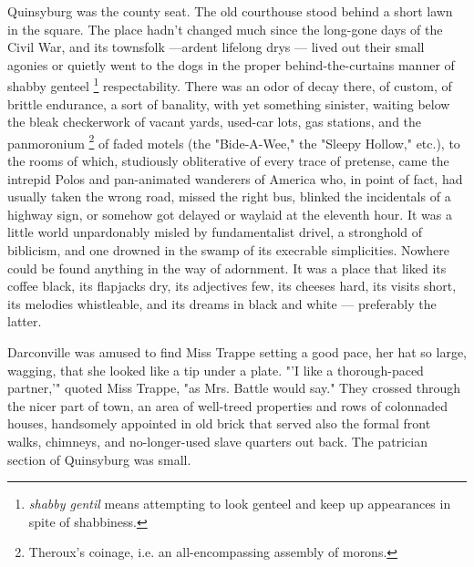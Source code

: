   Quinsyburg was the county seat. The old courthouse stood behind a short lawn
in the square. The place hadn't changed much since the long-gone days of the
Civil War, and its townsfolk ---ardent lifelong drys --- lived out their small 
agonies or quietly went to the dogs in the proper behind-the-curtains manner 
of shabby genteel 
\footnote{\textit{shabby gentil} means attempting to look genteel and keep 
          up appearances in spite of shabbiness.}
respectability. There was an odor of decay there, of custom, of brittle
endurance, a sort of banality, 
with yet something sinister, waiting below the bleak checkerwork 
of vacant yards, used-car lots, gas stations, and the panmoronium 
\footnote{Theroux's coinage, i.e. an all-encompassing assembly of morons.}
of faded motels (the "Bide-A-Wee," the "Sleepy Hollow," etc.), to
the rooms of which, studiously 
obliterative 
of every trace of pretense, came the intrepid 
Polos and pan-animated wanderers of America who, in point of fact, had
usually taken the wrong road, missed the right bus, blinked the incidentals of a
highway sign, or somehow got delayed or waylaid 
at the eleventh hour. It was a
little world unpardonably misled by fundamentalist drivel, 
a stronghold of biblicism, and one drowned in the swamp of its execrable 
simplicities. Nowhere could be found anything in the way of adornment. It was a 
place that liked its coffee black, its flapjacks 
dry, its adjectives few, its cheeses hard, its
visits short, its melodies whistleable, and its dreams in black and
white --- preferably the latter.

  Darconville was amused to find Miss Trappe setting a good pace, her hat so
large, wagging, 
that she looked like a tip under a plate. "'I like a
thorough-paced partner,'" quoted Miss Trappe, "as Mrs. Battle would say." They
crossed through the nicer part of town, an area of well-treed properties and
rows of colonnaded 
houses, handsomely appointed in old brick that served also the formal front walks, 
chimneys, and no-longer-used slave quarters out back. The patrician 
section of Quinsyburg was small.

